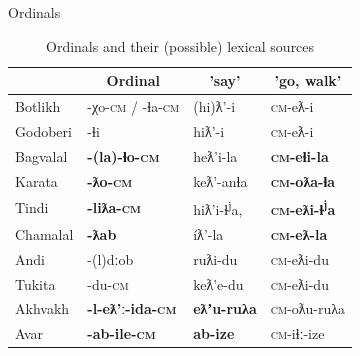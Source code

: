 \begin{frame}{Ordinals}
\begin{table}[h]
\caption{Ordinals and their (possible) lexical sources}
\label{tab:ordsaygo}
\begin{tabular}{l|lll}
                                                             & \multicolumn{1}{c}{Ordinal}            & \multicolumn{1}{c}{'say'}       & \multicolumn{1}{c}{'go, walk'} \\ \hline
\rowcolor[HTML]{EFEFEF} 
Botlikh                                                      & {\color[HTML]{FE0000} -χo-\textsc{cm} / -ɬa-\textsc{cm}} & {\color[HTML]{FE0000} (hi)ƛ'-i} & {\color[HTML]{FE0000} \textsc{cm}-eƛ-i} \\
Godoberi                                                     & {\color[HTML]{000000} -ɬi}             & hiƛ'-i                          & \textsc{cm}-eƛ-i                        \\
\rowcolor[HTML]{EFEFEF} 
Bagvalal                                                     & \textbf{-(la)-ɬo-\textsc{cm}}                   & heƛ'i-la                        & \textbf{\textsc{cm}-eɬi-la}             \\
Karata                                                       & \textbf{-ƛo-\textsc{cm}}                        & keƛ'-anɬa                       & \textbf{\textsc{cm}-oƛa-ɬa}             \\
\rowcolor[HTML]{EFEFEF} 
Tindi                                                        & \textbf{-liƛa-\textsc{cm}}                      & hiƛ'i-ɬ\textsuperscript{j}a,                      & \textbf{\textsc{cm}-eƛi-ɬ\textsuperscript{j}a}            \\
Chamalal                                                     & \textbf{-ƛab}                          & íƛ'-la                          & \textbf{\textsc{cm}-eƛ-la}              \\
\rowcolor[HTML]{EFEFEF} 
Andi                                                         & -(l)dːob                                & ruƛi-du                         & \textsc{cm}-eƛi-du                      \\
Tukita  & -du-\textsc{cm}                                 & keƛ'e-du                        & \textsc{cm}-eƛi-du                      \\
\rowcolor[HTML]{EFEFEF} 
Akhvakh & \textbf{-l-eƛ'ː-ida-\textsc{cm}}                & \textbf{eƛʼu-ruλa}              & \textsc{cm}-oƛu-ruλa                    \\
Avar                                                         & \textbf{-ab-ile-\textsc{cm}}                    & \textbf{ab-ize}                 & \textsc{cm}-iɬː-ize                    
\end{tabular}
\end{table}


\end{frame}
